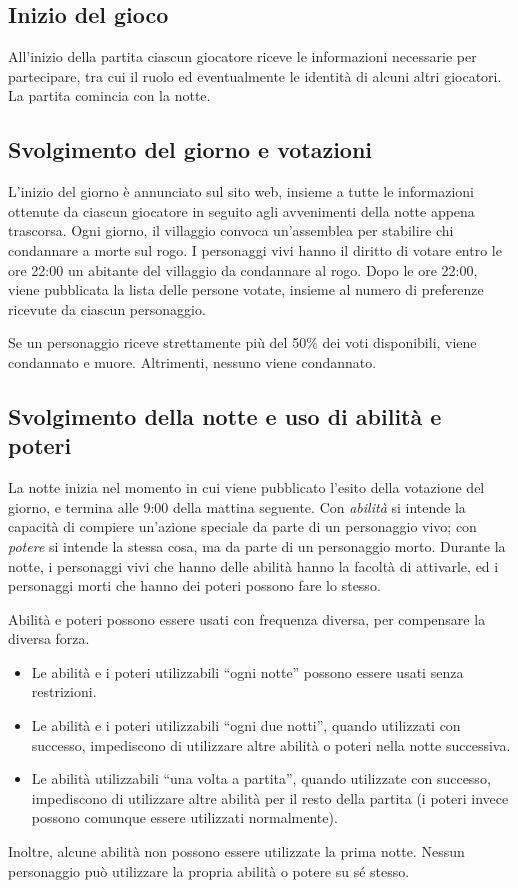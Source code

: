 \documentclass[a4paper,10pt]{article}
\begin{document}
\subsection{Inizio del gioco}

All'inizio della partita ciascun giocatore riceve le informazioni necessarie per partecipare, tra cui il ruolo ed eventualmente le identità di alcuni altri giocatori. La partita comincia con la notte.


\subsection{Svolgimento del giorno e votazioni}

L'inizio del giorno è annunciato sul sito web, insieme a tutte le informazioni ottenute da ciascun giocatore in seguito agli avvenimenti della notte appena trascorsa. Ogni giorno, il villaggio convoca un'assemblea per stabilire chi condannare a morte sul rogo. I personaggi vivi hanno il diritto di votare entro le ore 22:00 un abitante del villaggio da condannare al rogo. Dopo le ore 22:00, viene pubblicata la lista delle persone votate, insieme al numero di preferenze ricevute da ciascun personaggio.

Se un personaggio riceve strettamente più del 50\% dei voti disponibili, viene condannato e muore. Altrimenti, nessuno viene condannato.

\subsection{Svolgimento della notte e uso di abilità e poteri}

La notte inizia nel momento in cui viene pubblicato l'esito della votazione del giorno, e termina alle 9:00 della mattina seguente. Con \emph{abilità} si intende la capacità di compiere un'azione speciale da parte di un personaggio vivo; con \emph{potere} si intende la stessa cosa, ma da parte di un personaggio morto. Durante la notte, i personaggi vivi che hanno delle abilità hanno la facoltà di attivarle, ed i personaggi morti che hanno dei poteri possono fare lo stesso.

Abilità e poteri possono essere usati con frequenza diversa, per compensare la diversa forza.
\begin{itemize}
    \item Le abilità e i poteri utilizzabili ``ogni notte'' possono essere usati senza restrizioni.
    \item Le abilità e i poteri utilizzabili ``ogni due notti'', quando utilizzati con successo, impediscono di utilizzare altre abilità o poteri nella notte successiva.
    \item Le abilità utilizzabili ``una volta a partita'', quando utilizzate con successo, impediscono di utilizzare altre abilità per il resto della partita (i poteri invece possono comunque essere utilizzati normalmente).
\end{itemize}
Inoltre, alcune abilità non possono essere utilizzate la prima notte. Nessun personaggio può utilizzare la propria abilità o potere su sé stesso.
\end{document}
